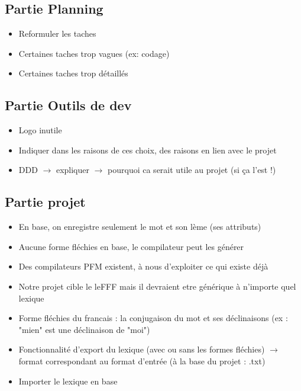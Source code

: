 \documentclass{article}
\begin{document}
\subsection{Partie Planning}
\begin{itemize}
    \item Reformuler les taches
    \item Certaines taches trop vagues (ex: codage)
    \item Certaines taches trop détaillés
\end{itemize}

\subsection{Partie Outils de dev}
\begin{itemize}
    \item Logo inutile
    \item Indiquer dans les raisons de ces choix, des raisons en lien avec le projet
    \item DDD $\longrightarrow$ expliquer $\longrightarrow$  pourquoi ca serait utile au projet (si ça l'est !)
\end{itemize}

\subsection{Partie projet}
\begin{itemize}
    \item En base, on enregistre seulement le mot et son lème (ses attributs)
    \item Aucune forme fléchies en base, le compilateur peut les générer
    \item Des compilateurs PFM existent, à nous d'exploiter ce qui existe déjà
    \item Notre projet cible le leFFF mais il devraient etre générique à n'importe quel lexique
    \item Forme fléchies du francais : la conjugaison du mot et ses déclinaisons (ex : "mien" est une déclinaison de "moi")
    \item Fonctionnalité d'export du lexique (avec ou sans les formes fléchies) $\longrightarrow$ format correspondant au format d'entrée (à la base du projet : .txt)
    \item Importer le lexique en base
\end{itemize}
\end{document}
